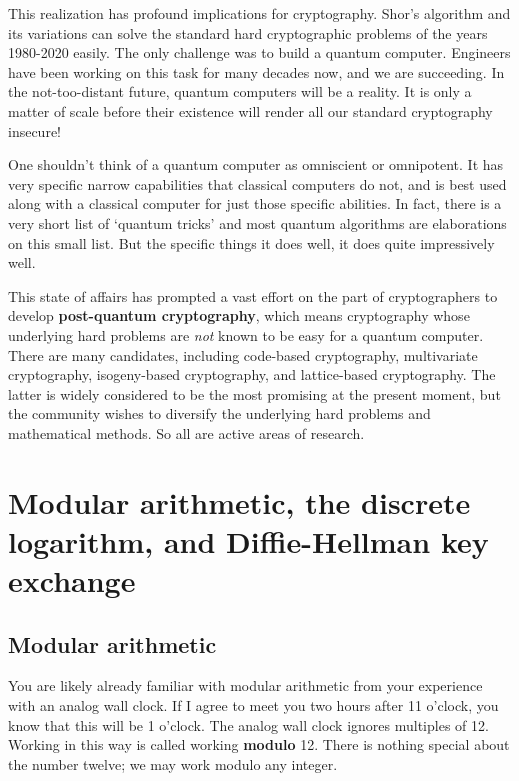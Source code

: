\documentclass{article}
\theoremstyle{plain}
\theoremstyle{definition}
\theoremstyle{remark}
\numberwithin{theorem}{section}
\begin{document}
This realization has profound implications for cryptography.  Shor's algorithm and its variations can solve the standard hard cryptographic problems of the years 1980-2020 easily.  The only challenge was to build a quantum computer.  Engineers have been working on this task for many decades now, and we are succeeding.  In the not-too-distant future, quantum computers will be a reality.  It is only a matter of scale before their existence will render all our standard cryptography insecure!

One shouldn't think of a quantum computer as omniscient or omnipotent.  It has very specific narrow capabilities that classical computers do not, and is best used along with a classical computer for just those specific abilities.  In fact, there is a very short list of `quantum tricks' and most quantum algorithms are elaborations on this small list.  But the specific things it does well, it does quite impressively well.

This state of affairs has prompted a vast effort on the part of cryptographers to develop \textbf{post-quantum cryptography}, which means cryptography whose underlying hard problems are \emph{not} known to be easy for a quantum computer.  There are many candidates, including code-based cryptography, multivariate cryptography, isogeny-based cryptography, and lattice-based cryptography.  The latter is widely considered to be the most promising at the present moment, but the community wishes to diversify the underlying hard problems and mathematical methods.  So all are active areas of research.





\section{Modular arithmetic, the discrete logarithm, and Diffie-Hellman key exchange}

\subsection{Modular arithmetic}
\label{sec:modular-arithmetic}

You are likely already familiar with modular arithmetic from your experience with an analog wall clock.  If I agree to meet you two hours after 11 o'clock, you know that this will be 1 o'clock.  The analog wall clock ignores multiples of 12.  Working in this way is called working \textbf{modulo} 12.  There is nothing special about the number twelve; we may work modulo any integer.
\end{document}
